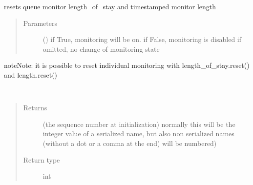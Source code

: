 \documentclass[letterpaper,10pt,english]{sphinxmanual}
\begin{document}
\begin{fulllineitems}
\begin{fulllineitems}
\end{fulllineitems}


\begin{fulllineitems}
\label{\detokenize{Reference:salabim.Queue.reset_monitors}}
resets queue monitor length\_of\_stay and timestamped monitor length
\begin{quote}\begin{description}
\item[{Parameters}] \leavevmode
{} () \textendash{} if True, monitoring will be on. 
if False, monitoring is disabled 
if omitted, no change of monitoring state

\end{description}\end{quote}

\begin{sphinxadmonition}{note}{Note:}
it is possible to reset individual monitoring with length\_of\_stay.reset() and length.reset()
\end{sphinxadmonition}

\end{fulllineitems}


\begin{fulllineitems}
\label{\detokenize{Reference:salabim.Queue.sequence_number}}~\begin{quote}\begin{description}
\item[{Returns}] \leavevmode
{} \textendash{} (the sequence number at initialization) 
normally this will be the integer value of a serialized name,
but also non serialized names (without a dot or a comma at the end)
will be numbered)

\item[{Return type}] \leavevmode
int

\end{description}\end{quote}

\end{fulllineitems}



\end{fulllineitems}
\end{document}
